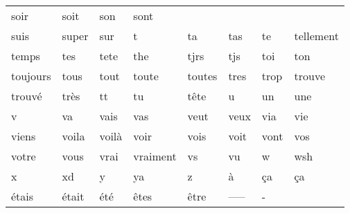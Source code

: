 \begin{tabular}{llllllll}
soir&soit&son&sont\\suis&super&sur&t&ta&tas&te&tellement\\temps&tes&tete&the&tjrs&tjs&toi&ton\\
toujours&tous&tout&toute&toutes&tres&trop&trouve\\trouvé&très&tt&tu&tête&u&un&une\\v&va&vais&vas&
veut&veux&via&vie\\viens&voila&voilà&voir&vois&voit&vont&vos\\votre&vous&vrai&vraiment&vs&vu&w&wsh\\x&
xd&y&ya&z&à&ça&ça\\étais&était&été&êtes&être&–—&-&
\end{tabular}